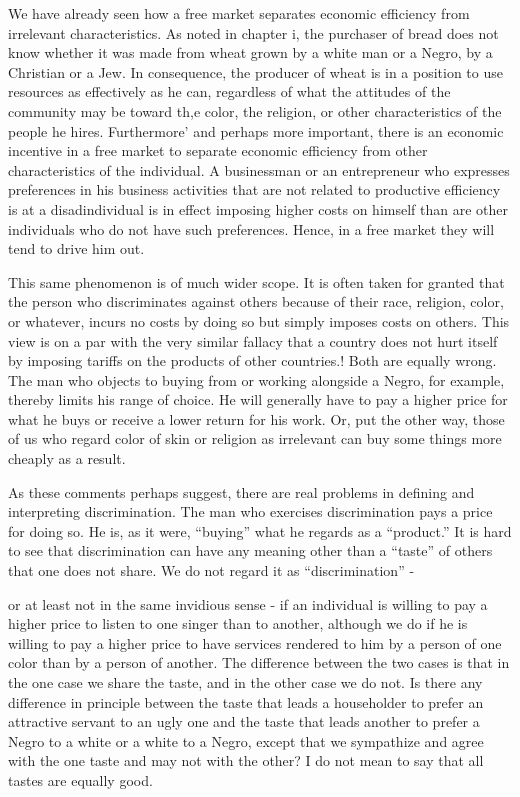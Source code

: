 \documentclass[11pt,openany]{book}
\begin{document}
We have already seen how a free market separates economic efficiency from irrelevant characteristics. As noted in chapter i, the purchaser of bread does not know whether it was made from wheat grown by a white man or a Negro, by a Christian or a Jew. In consequence, the producer of wheat is in a position to use resources as effectively as he can, regardless of what the attitudes of the community may be toward th,e color, the religion, or other characteristics of the people he hires. Furthermore' and perhaps more important, there is an economic incentive in a free market to separate economic efficiency from other characteristics of the individual. A businessman or an entrepreneur who expresses preferences in his business activities that are not related to productive efficiency is at a disadindividual is in effect imposing higher costs on himself than are other individuals who do not have such preferences. Hence, in a free market they will tend to drive him out.

This same phenomenon is of much wider scope. It is often taken for granted that the person who discriminates against others because of their race, religion, color, or whatever, incurs no costs by doing so but simply imposes costs on others. This view is on a par with the very similar fallacy that a country does not hurt itself by imposing tariffs on the products of other countries.! Both are equally wrong. The man who objects to buying from or working alongside a Negro, for example, thereby limits his range of choice. He will generally have to pay a higher price for what he buys or receive a lower return for his work. Or, put the other way, those of us who regard color of skin or religion as irrelevant can buy some things more cheaply as a result.

As these comments perhaps suggest, there are real problems in defining and interpreting discrimination. The man who exercises discrimination pays a price for doing so. He is, as it were, ``buying'' what he regards as a ``product.'' It is hard to see that discrimination can have any meaning other than a ``taste'' of others that one does not share. We do not regard it as ``discrimination'' -

or at least not in the same invidious sense - if an individual is willing to pay a higher price to listen to one singer than to another, although we do if he is willing to pay a higher price to have services rendered to him by a person of one color than by a person of another. The difference between the two cases is that in the one case we share the taste, and in the other case we do not. Is there any difference in principle between the taste that leads a householder to prefer an attractive servant to an ugly one and the taste that leads another to prefer a Negro to a white or a white to a Negro, except that we sympathize and agree with the one taste and may not with the other? I do not mean to say that all tastes are equally good.
\end{document}
